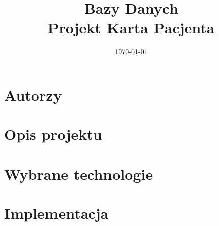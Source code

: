\documentclass[12pt,a4paper]{article}
\begin{document}
\title{Bazy Danych\\Projekt Karta Pacjenta}
\date{\today}

\maketitle

\tableofcontents
\clearpage

\section{Autorzy}


\section{Opis projektu}


\section{Wybrane technologie}


\section{Implementacja}



\end{document}
